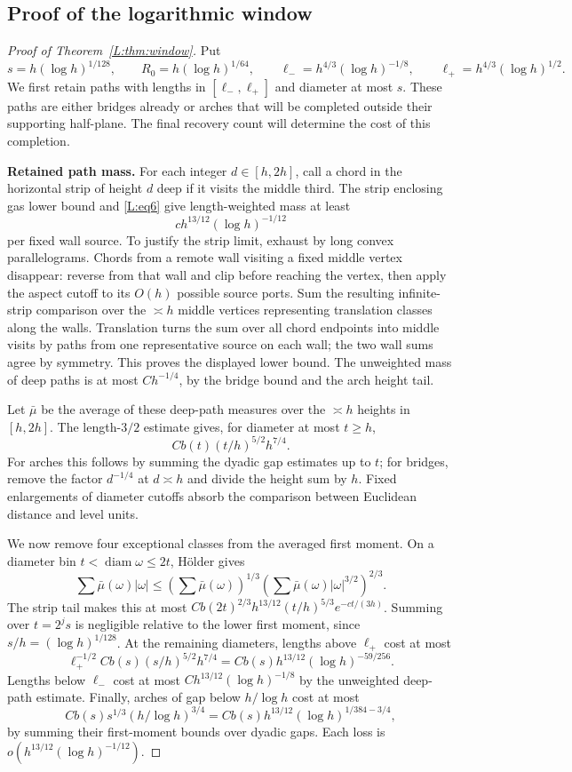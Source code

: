 \documentclass[11pt]{article}
\numberwithin{equation}{section}
\theoremstyle{definition}\newtheorem{definition}[theorem]{Definition}
\theoremstyle{remark}\newtheorem{remark}[theorem]{Remark}
\begin{document}
\subsection{Proof of the logarithmic window}\label{L:step20}
\begin{proof}[Proof of Theorem~\ref{L:thm:window}]
Put
\[
 s=h(\log h)^{1/128},\qquad R_0=h(\log h)^{1/64},\qquad
 \ell_-=h^{4/3}(\log h)^{-1/8},\qquad
 \ell_+=h^{4/3}(\log h)^{1/2}.
\]
We first retain paths with lengths in $[\ell_-,\ell_+]$ and diameter
at most $s$.  These paths are either bridges already or arches that
will be completed outside their supporting half-plane.  The final
recovery count will determine the cost of this completion.

\medskip\noindent\textbf{Retained path mass.}
For each integer $d\in[h,2h]$, call a chord in the horizontal strip
of height $d$ deep if it visits the middle third.  The strip enclosing
gas lower bound and \eqref{L:eq6} give length-weighted mass at least
\[
 c h^{13/12}(\log h)^{-1/12}
\]
per fixed wall source.  To justify the strip limit, exhaust by long
convex parallelograms.  Chords from a remote wall visiting a fixed
middle vertex disappear: reverse from that wall and clip before
reaching the vertex, then apply the aspect cutoff to its $O(h)$
possible source ports.  Sum the resulting infinite-strip comparison
over the $\asymp h$ middle vertices representing translation classes
along the walls.  Translation turns the sum over all chord endpoints
into middle visits by paths from one representative source on each
wall; the two wall sums agree by symmetry.  This proves the displayed
lower bound.  The unweighted mass of deep paths is at most
$Ch^{-1/4}$, by the bridge bound and the arch height tail.

Let $\bar\mu$ be the average of these deep-path measures over the
$\asymp h$ heights in $[h,2h]$.
The length-$3/2$ estimate gives, for diameter at most $t\ge h$,
\[
 Cb(t)(t/h)^{5/2}h^{7/4}.
\]
For arches this follows by summing the dyadic gap estimates up to
$t$; for bridges, remove the factor $d^{-1/4}$ at $d\asymp h$
and divide the height sum by $h$.  Fixed enlargements of diameter
cutoffs absorb the comparison between Euclidean distance and level
units.

We now remove four exceptional classes from the averaged first
moment.  On a diameter bin $t<\operatorname{diam}\omega\le2t$,
H\"older gives
\[
 \sum\bar\mu(\omega)|\omega|
 \le\left(\sum\bar\mu(\omega)\right)^{1/3}
      \left(\sum\bar\mu(\omega)|\omega|^{3/2}\right)^{2/3}.
\]
The strip tail makes this at most
$Cb(2t)^{2/3}h^{13/12}(t/h)^{5/3}e^{-ct/(3h)}$.
Summing over $t=2^js$ is negligible relative to the lower first
moment, since $s/h=(\log h)^{1/128}$.
At the remaining diameters, lengths above $\ell_+$ cost at most
\[
 \ell_+^{-1/2}Cb(s)(s/h)^{5/2}h^{7/4}
 =Cb(s)h^{13/12}(\log h)^{-59/256}.
\]
Lengths below $\ell_-$ cost at most
$Ch^{13/12}(\log h)^{-1/8}$ by the unweighted deep-path estimate.
Finally, arches of gap below $h/\log h$ cost at most
\[
 Cb(s)s^{1/3}(h/\log h)^{3/4}
 =Cb(s)h^{13/12}(\log h)^{1/384-3/4},
\]
by summing their first-moment bounds over dyadic gaps.
Each loss is $o(h^{13/12}(\log h)^{-1/12})$.


\end{proof}
\end{document}
